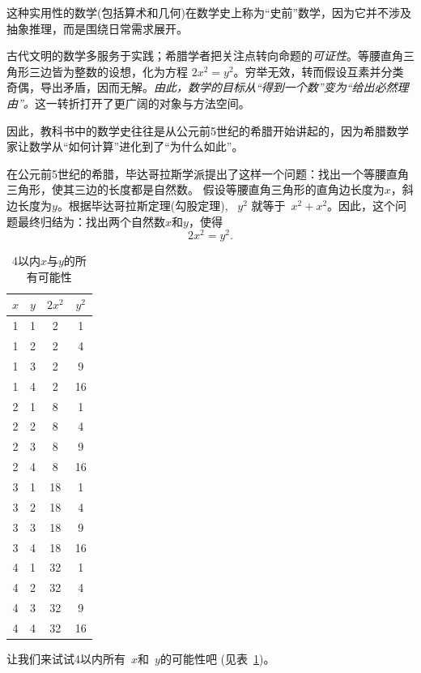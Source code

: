 
这种实用性的数学(包括算术和几何)在数学史上称为“史前”数学，因为它并不涉及抽象推理，而是围绕日常需求展开。
	
古代文明的数学多服务于实践；希腊学者把关注点转向命题的\emph{可证性}。等腰直角三角形三边皆为整数的设想，化为方程 $2x^2=y^2$。穷举无效，转而假设互素并分类奇偶，导出矛盾，因而无解。\emph{由此，数学的目标从“得到一个数”变为“给出必然理由”。}这一转折打开了更广阔的对象与方法空间。

因此，教科书中的数学史往往是从公元前5世纪的希腊开始讲起的，因为希腊数学家让数学从“如何计算”进化到了“为什么如此”。

在公元前5世纪的希腊，毕达哥拉斯学派提出了这样一个问题：找出一个等腰直角三角形，使其三边的长度都是自然数。
假设等腰直角三角形的直角边长度为$x$，斜边长度为$y$。根据毕达哥拉斯定理(勾股定理), ~$y^2$ 就等于~$x^2+x^2$。因此，这个问题最终归结为：找出两个自然数$x$和$y$，使得
\begin{equation}\label{eqn}
2x^2=y^2.
\end{equation}

\begin{table}[htbp]
\centering
\caption{4以内$x$与$y$的所有可能性}
\begin{tabular}{|c|c|c|c|}
\hline
$x$ & $y$ & $2x^2$ & $y^2$ \\
\hline
1 & 1 & 2 & 1 \\
\hline
1 & 2 & 2 & 4 \\
\hline
1 & 3 & 2 & 9 \\
\hline
1 & 4 & 2 & 16 \\
\hline
2 & 1 & 8 & 1 \\
\hline
2 & 2 & 8 & 4 \\
\hline
2 & 3 & 8 & 9 \\
\hline
2 & 4 & 8 & 16 \\
\hline
3 & 1 & 18 & 1 \\
\hline
3 & 2 & 18 & 4 \\
\hline
3 & 3 & 18 & 9 \\
\hline
3 & 4 & 18 & 16 \\
\hline
4 & 1 & 32 & 1 \\
\hline
4 & 2 & 32 & 4 \\
\hline
4 & 3 & 32 & 9 \\
\hline
4 & 4 & 32 & 16 \\
\hline
\end{tabular}
\label{tab:example}
\end{table}
让我们来试试4以内所有~$x$和~$y$的可能性吧 (见表~\ref{tab:example})。

